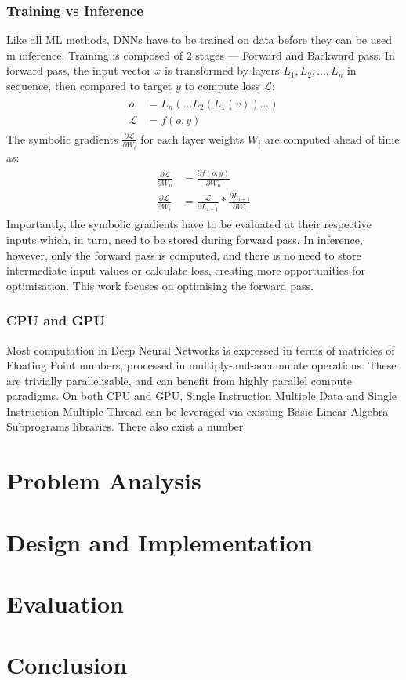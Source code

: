 \documentclass[12pt]{article}
\newcommand{\Loss}{\mathcal{L}}
\begin{document}
\subsubsection{Training vs Inference}
Like all ML methods, DNNs have to be trained on data before they can be used in inference. Training is composed of 2 stages --- Forward and Backward pass.
In forward pass, the input vector $x$ is transformed by layers $L_1, L_2,..., L_n$  in sequence, then compared to target $y$ to compute loss $\Loss$:
\begin{gather}
\begin{split}
    o &= L_n( ... L_2(L_1(v)) ... )\\
    \Loss &= f(o, y) 
\end{split}
\end{gather}
The symbolic gradients $\frac{\partial \Loss}{\partial W_i}$ for each layer weights $W_i$ are computed ahead of time as:
\begin{gather}
\begin{split}
    \frac{\partial \Loss}{\partial W_n} &= \frac{\partial f(o, y)}{\partial W_n}\\
    \frac{\partial \Loss}{\partial W_i} &= \frac{\Loss}{\partial L_{i+1}} * \frac{\partial L_{i+1}}{\partial W_i}
\end{split}
\end{gather}
Importantly, the symbolic gradients have to be evaluated at their respective inputs which, in turn, need to be stored during forward pass.
In inference, however, only the forward pass is computed, and there is no need to store intermediate input values or calculate loss, creating more opportunities for optimisation.
This work focuses on optimising the forward pass.

\subsubsection{CPU and GPU}
Most computation in Deep Neural Networks is expressed in terms of matricies of Floating Point numbers, processed in multiply-and-accumulate operations.
These are trivially parallelisable, and can benefit from highly parallel compute paradigms\cite{sze2017efficient}.
On both CPU and GPU, Single Instruction Multiple Data and Single Instruction Multiple Thread can be leveraged via existing Basic Linear Algebra Subprograms libraries.
There also exist a number

\section{Problem Analysis}
\section{Design and Implementation}
\section{Evaluation}
\section{Conclusion}


\end{document}
